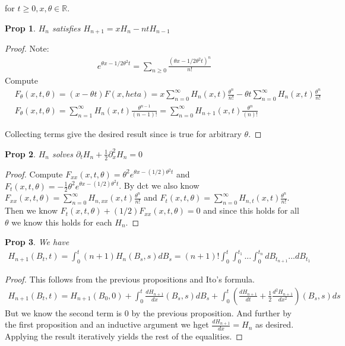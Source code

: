 \documentclass[11pt]{article}
\newcommand{\R}{\mathbb{R}}
\newtheorem{prop}{Prop}
\begin{document}
for $t \geq 0, x, \theta \in \R$.

\begin{prop}
	$H_n$ satisfies $H_{n+1} = x H_n - nt H_{n-1}$
\end{prop}

\begin{proof}
	Note:
	\begin{align*}
		e^{\theta x - 1/2 \theta^2 t} = \sum_{n \geq 0} \frac{(\theta x - 1/2 \theta^2 t)^n}{n!}
	\end{align*}
	Compute
	\begin{align*}
		&F_{\theta}(x,t,\theta) = (x-\theta t)F(x,heta)  = x\sum_{n=0}^{\infty} H_n(x,t) \frac{\theta^n}{n!} - \theta t \sum_{n=0}^{\infty} H_n(x,t) \frac{\theta^n}{n!}\\
		&F_{\theta}(x,t,\theta) = \sum_{n=1}^{\infty} H_n(x,t) \frac{\theta^{n-1}}{(n-1)!} = \sum_{n=0}^{\infty} H_{n+1}(x,t) \frac{\theta^{n}}{(n)!}
	\end{align*}

	Collecting terms give the desired result since is true for arbitrary $\theta$.
\end{proof}

\begin{prop}
	$H_n$ solves $\partial_t H_n + \frac{1}{2}\partial_x^2 H_n = 0$
\end{prop}

\begin{proof}
	Compute $F_{xx}(x,t,\theta) = \theta^2 e^{\theta x -(1/2)\theta^2 t}$ and $F_t(x,t,\theta) = -\frac{1}{2} \theta^2 e^{\theta x - (1/2) \theta^2 t}$. By dct we also know $F_{xx}(x,t,\theta) = \sum_{n=0}^{\infty} H_{n,xx}(x,t)\frac{\theta^n}{n!}$ and $F_{t}(x,t,\theta) = \sum_{n=0}^{\infty} H_{n,t}(x,t)\frac{\theta^n}{n!}$. Then we know $F_t(x,t,\theta) + (1/2)F_{xx}(x,t,\theta) = 0$ and since this holds for all $\theta$ we know this holds for each $H_n$.
\end{proof}

\begin{prop}
	We have
	\begin{align*}
		H_{n+1}(B_t,t) = \int_0^t (n+1)H_n(B_s,s)dB_s = (n+1)! \int_0^t \int_0^{t_1}...\int_0^{t_n} dB_{t_{n+1}} ... dB_{t_1}
	\end{align*}
\end{prop}

\begin{proof}
	This follows from the previous propositions and Ito's formula. 
	\begin{align*}
		H_{n+1}(B_t,t) = H_{n+1}(B_0,0) + \int_0^t \frac{dH_{n+1}}{dx}(B_s,s)dB_s + \int_0^t (\frac{dH_{n+1}}{dt} + \frac{1}{2}\frac{d^2H_{n+1}}{dx^2})(B_s,s)ds
	\end{align*}
	But we know the second term is 0 by the previous proposition. And further by the first proposition and an inductive argument we hget $\frac{dH_{n+1}}{dx} = H_n$ as desired. Applying the result iteratively yields the rest of the equalities.
\end{proof}
\end{document}
